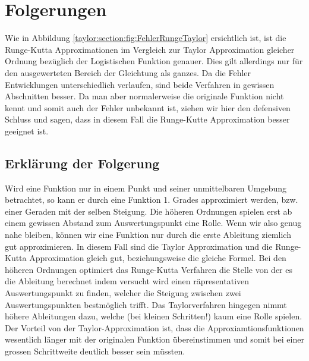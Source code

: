 %
%
%
\section{Folgerungen
\label{taylor:section:folgerungen}}
Wie in Abbildung \ref{taylor:section:fig:FehlerRungeTaylor} ersichtlich ist, ist die Runge-Kutta Approximationen im Vergleich zur Taylor Approximation gleicher Ordnung bezüglich der Logistischen Funktion genauer.
Dies gilt allerdings nur für den ausgewerteten Bereich der Gleichtung als ganzes.
Da die Fehler Entwicklungen unterschiedlich verlaufen, sind beide Verfahren in gewissen Abschnitten besser.
Da man aber normalerweise die originale Funktion nicht kennt und somit auch der Fehler unbekannt ist, ziehen wir hier den defensiven Schluss und sagen, dass in diesem Fall die Runge-Kutte Approximation besser geeignet ist.

\subsection{Erklärung der Folgerung
\label{taylor:subsection:malorum}}
Wird eine Funktion nur in einem Punkt und seiner unmittelbaren Umgebung betrachtet, so kann er durch eine Funktion 1. Grades approximiert werden, bzw. einer Geraden mit der selben Steigung.
Die höheren Ordnungen spielen erst ab einem gewissen Abstand zum Auswertungspunkt eine Rolle.
Wenn wir also genug nahe bleiben, können wir eine Funktion nur durch die erste Ableitung ziemlich gut approximieren.
In diesem Fall sind die Taylor Approximation und die Runge-Kutta Approximation gleich gut, beziehungsweise die gleiche Formel.
Bei den höheren Ordnungen optimiert das Runge-Kutta Verfahren die Stelle von der es die Ableitung berechnet indem versucht wird einen räpresentativen Auswertungspunkt zu finden, welcher die Steigung zwischen zwei Auswertungspunkten bestmöglich trifft.
Das Taylorverfahren hingegen nimmt höhere Ableitungen dazu, welche (bei kleinen Schritten!) kaum eine Rolle spielen. 
Der Vorteil von der Taylor-Approximation ist, dass die Approxiamtionsfunktionen wesentlich länger mit der originalen Funktion übereinstimmen und somit bei einer grossen Schrittweite deutlich besser sein müssten.


